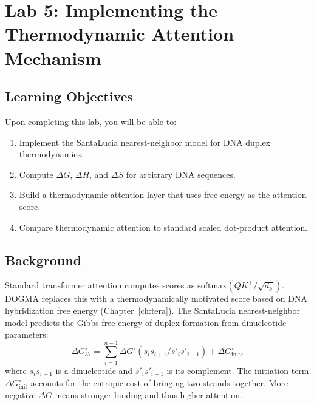 \section{Lab 5: Implementing the Thermodynamic Attention Mechanism}
\label{sec:lab5-thermo-attention}

\subsection{Learning Objectives}

Upon completing this lab, you will be able to:
\begin{enumerate}[leftmargin=1.8em]
  \item Implement the SantaLucia nearest-neighbor model for DNA duplex thermodynamics.
  \item Compute $\Delta G$, $\Delta H$, and $\Delta S$ for arbitrary DNA sequences.
  \item Build a thermodynamic attention layer that uses free energy as the attention score.
  \item Compare thermodynamic attention to standard scaled dot-product attention.
\end{enumerate}

\subsection{Background}

Standard transformer attention computes scores as $\text{softmax}(QK^\top / \sqrt{d_k})$. DOGMA replaces this with a thermodynamically motivated score based on DNA hybridization free energy (Chapter~\ref{ch:tera}). The SantaLucia nearest-neighbor model predicts the Gibbs free energy of duplex formation from dinucleotide parameters:
\begin{equation}
\Delta G^\circ_{37} = \sum_{i=1}^{n-1} \Delta G^\circ(s_i s_{i+1} / s'_i s'_{i+1}) + \Delta G^\circ_{\text{init}},
\label{eq:santalucia}
\end{equation}
where $s_i s_{i+1}$ is a dinucleotide and $s'_i s'_{i+1}$ is its complement. The initiation term $\Delta G^\circ_{\text{init}}$ accounts for the entropic cost of bringing two strands together. More negative $\Delta G$ means stronger binding and thus higher attention.

